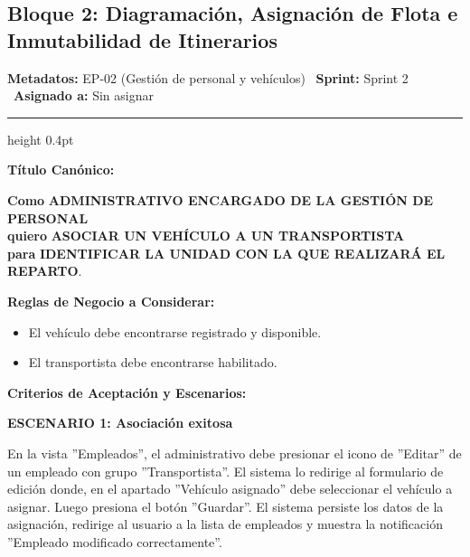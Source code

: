 \documentclass[a4paper,9pt]{article}
\begin{document}
\subsection{Bloque 2: Diagramación, Asignación de Flota e Inmutabilidad de Itinerarios}

\begin{tcolorbox}[hucard, title={\textbf{HU-10: ASIGNAR VEHÍCULO A TRANSPORTISTA} \hfill \scriptsize \colorbox{bluestatus}{\textbf{\ New\ }} \quad \colorbox{white}{\textcolor{primarydark}{\textbf{\ 2 pts\ }}}}]
\vspace{-1pt}
\noindent\textbf{\footnotesize Metadatos:} EP-02 (Gestión de personal y vehículos) \textbar\ \textbf{Sprint:} Sprint 2 \textbar\ \textbf{Asignado a:} Sin asignar\par\vspace{2pt}
\hrule height 0.4pt\par\vspace{3pt}
\noindent\textbf{\footnotesize Título Canónico:}\par\vspace{1pt}
{\small \textbf{Como} \textbf{ADMINISTRATIVO ENCARGADO DE LA GESTIÓN DE PERSONAL} \\ \textbf{quiero} \textbf{ASOCIAR UN VEHÍCULO A UN TRANSPORTISTA} \\ \textbf{para} \textbf{IDENTIFICAR LA UNIDAD CON LA QUE REALIZARÁ EL REPARTO}.}\par\vspace{3pt}
\noindent\textbf{\footnotesize Reglas de Negocio a Considerar:}\par\vspace{1pt}
{\footnotesize
\begin{itemize}[leftmargin=12pt, nosep, itemsep=1.5pt, topsep=1pt]
\item El vehículo debe encontrarse registrado y disponible.
\item El transportista debe encontrarse habilitado.
\end{itemize}
}\par\vspace{3pt}
\noindent\textbf{\footnotesize Criterios de Aceptación y Escenarios:}\par\vspace{2pt}
{\footnotesize
\noindent\textbf{\textcolor{secondarydark}{ESCENARIO 1:  Asociación exitosa}}\par\vspace{1pt}
En la vista ''Empleados'', el administrativo debe presionar el icono de ''Editar'' de un empleado con grupo ''Transportista''. El sistema lo redirige al formulario de edición donde, en el apartado ''Vehículo asignado'' debe seleccionar el vehículo a asignar. Luego presiona el botón ''Guardar''. El sistema persiste los datos de la asignación, redirige al usuario a la lista de empleados y muestra la notificación ''Empleado modificado correctamente''.\par\vspace{2.5pt}
}
\end{tcolorbox}
\end{document}
